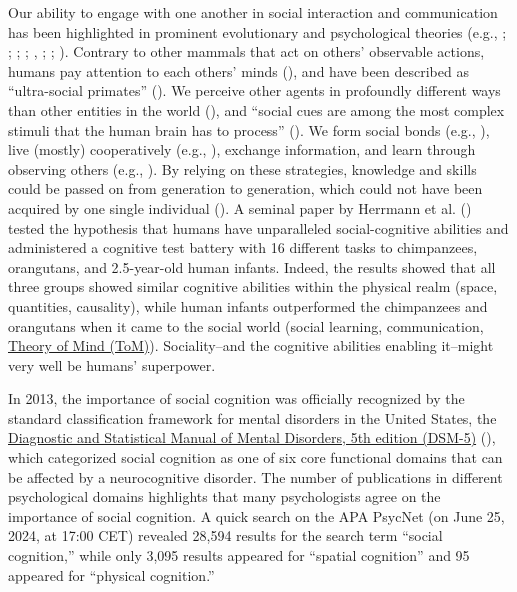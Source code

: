 \documentclass[
]{scrbook}
\begin{document}
Our ability to engage with one another in social interaction and communication has been highlighted in prominent evolutionary and psychological theories (e.g., ; ; ; ; , ; ; ). Contrary to other mammals that act on others' observable actions, humans pay attention to each others' minds (), and have been described as ``ultra-social primates'' (). We perceive other agents in profoundly different ways than other entities in the world (), and ``social cues are among the most complex stimuli that the human brain has to process'' (). We form social bonds (e.g., ), live (mostly) cooperatively (e.g., ), exchange information, and learn through observing others (e.g., ). By relying on these strategies, knowledge and skills could be passed on from generation to generation, which could not have been acquired by one single individual (). A seminal paper by Herrmann et al. () tested the hypothesis that humans have unparalleled social-cognitive abilities and administered a cognitive test battery with 16 different tasks to chimpanzees, orangutans, and 2.5-year-old human infants. Indeed, the results showed that all three groups showed similar cognitive abilities within the physical realm (space, quantities, causality), while human infants outperformed the chimpanzees and orangutans when it came to the social world (social learning, communication, \hyperref[acronyms_ToM]{Theory of Mind (ToM)}). Sociality\thinspace --\thinspace and the cognitive abilities enabling it\thinspace --\thinspace might very well be humans' superpower.

In 2013, the importance of social cognition was officially recognized by the standard classification framework for mental disorders in the United States, the \hyperref[acronyms_DSM-5]{Diagnostic and Statistical Manual of Mental Disorders, 5th edition (DSM-5)} (), which categorized social cognition as one of six core functional domains that can be affected by a neurocognitive disorder. The number of publications in different psychological domains highlights that many psychologists agree on the importance of social cognition. A quick search on the APA PsycNet (on June 25, 2024, at 17:00 CET) revealed 28,594 results for the search term ``social cognition,'' while only 3,095 results appeared for ``spatial cognition'' and 95 appeared for ``physical cognition.''
\end{document}
